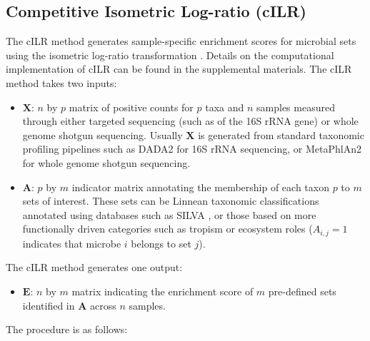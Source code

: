 \documentclass[10pt,letterpaper]{article}
\begin{document}
\subsection*{Competitive Isometric Log-ratio (cILR)}
The cILR method generates sample-specific enrichment scores for microbial sets using the isometric log-ratio transformation \cite{egozcue2003}. Details on the computational implementation of cILR can be found in the supplemental materials. The cILR method takes two inputs:  
\begin{itemize}
    \item $\mathbf{X}$: $n$ by $p$ matrix of positive counts for $p$ taxa and $n$ samples measured through either targeted sequencing (such as of the 16S rRNA gene) or whole genome shotgun sequencing. Usually $\mathbf{X}$ is generated from standard taxonomic profiling pipelines such as DADA2 \cite{callahan2016} for 16S rRNA sequencing, or MetaPhlAn2 \cite{truong2015} for whole genome shotgun sequencing. 
    \item $\mathbf{A}$: $p$ by $m$ indicator matrix annotating the membership of each taxon $p$ to $m$ sets of interest. These sets can be Linnean taxonomic classifications annotated using databases such as SILVA \cite{quast2013}, or those based on more functionally driven categories such as tropism or ecosystem roles ($A_{i,j} = 1$ indicates that microbe $i$ belongs to set $j$). 
\end{itemize}
The cILR method generates one output:  
\begin{itemize} 
    \item $\mathbf{E}$: $n$ by $m$ matrix indicating the enrichment score of $m$ pre-defined sets identified in $\mathbf{A}$ across $n$ samples. 
\end{itemize}
The procedure is as follows:  
\end{document}

